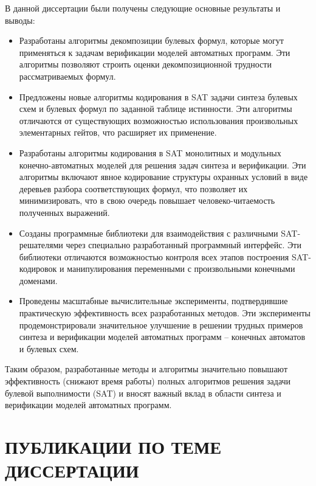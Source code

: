 В данной диссертации были получены следующие основные результаты и выводы:
\begin{itemize}[beginpenalty=10000]
    \item Разработаны алгоритмы декомпозиции булевых формул, которые могут применяться к задачам верификации моделей автоматных программ. Эти алгоритмы позволяют строить оценки декомпозиционной трудности рассматриваемых формул.

    \item Предложены новые алгоритмы кодирования в SAT задачи синтеза булевых схем и булевых формул по заданной таблице истинности. Эти алгоритмы отличаются от существующих возможностью использования произвольных элементарных гейтов, что расширяет их применение.

    \item Разработаны алгоритмы кодирования в SAT монолитных и модульных конечно-автоматных моделей для решения задач синтеза и верификации. Эти алгоритмы включают явное кодирование структуры охранных условий в виде деревьев разбора соответствующих формул, что позволяет их минимизировать, что в свою очередь повышает человеко-читаемость полученных выражений.

    \item Созданы программные библиотеки для взаимодействия с различными SAT-решателями через специально разработанный программный интерфейс. Эти библиотеки отличаются возможностью контроля всех этапов построения SAT-кодировок и манипулирования переменными с произвольными конечными доменами.

    \item Проведены масштабные вычислительные эксперименты, подтвердившие практическую эффективность всех разработанных методов. Эти эксперименты продемонстрировали значительное улучшение в решении трудных примеров синтеза и верификации моделей автоматных программ \--- конечных автоматов и булевых схем.
\end{itemize}

Таким образом, разработанные методы и алгоритмы значительно повышают эффективность (снижают время работы) полных алгоритмов решения задачи булевой выполнимости (SAT) и вносят важный вклад в области синтеза и верификации моделей автоматных программ.


\section*{ПУБЛИКАЦИИ ПО ТЕМЕ ДИССЕРТАЦИИ}

